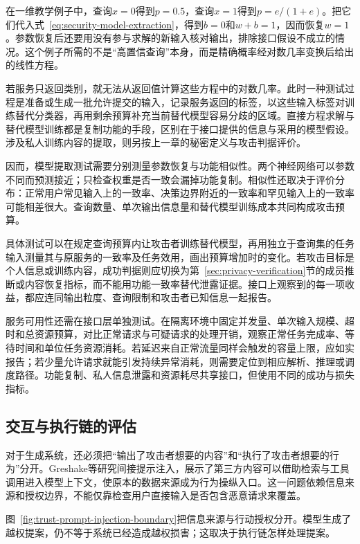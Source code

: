 在一维教学例子中，查询$x=0$得到$p=0.5$，查询$x=1$得到$p=e/(1+e)$。把它们代入式~\eqref{eq:security-model-extraction}，得到$b=0$和$w+b=1$，因而恢复$w=1$。参数恢复后还要用没有参与求解的新输入核对输出，排除接口假设不成立的情况。这个例子所需的不是“高置信查询”本身，而是精确概率经对数几率变换后给出的线性方程。

若服务只返回类别，就无法从返回值计算这些方程中的对数几率。此时一种测试过程是准备或生成一批允许提交的输入，记录服务返回的标签，以这些输入标签对训练替代分类器，再用剩余预算补充当前替代模型容易分歧的区域。直接方程求解与替代模型训练都是复制功能的手段，区别在于接口提供的信息与采用的模型假设。涉及私人训练内容的提取，则另按上一章的秘密定义与攻击判据评价。

因而，模型提取测试需要分别测量参数恢复与功能相似性。两个神经网络可以参数不同而预测接近；只检查权重是否一致会漏掉功能复制。相似性还取决于评价分布：正常用户常见输入上的一致率、决策边界附近的一致率和罕见输入上的一致率可能相差很大。查询数量、单次输出信息量和替代模型训练成本共同构成攻击预算。

具体测试可以在规定查询预算内让攻击者训练替代模型，再用独立于查询集的任务输入测量其与原服务的一致率及任务效用，画出预算增加时的变化。若攻击目标是个人信息或训练内容，成功判据则应切换为第~\ref{sec:privacy-verification}节的成员推断或内容恢复指标，而不能用功能一致率替代泄露证据。接口上观察到的每一项收益，都应连同输出粒度、查询限制和攻击者已知信息一起报告。

服务可用性还需在接口层单独测试。在隔离环境中固定并发量、单次输入规模、超时和总资源预算，对比正常请求与可疑请求的处理开销，观察正常任务完成率、等待时间和单位任务资源消耗。若延迟来自正常流量同样会触发的容量上限，应如实报告；若少量允许请求就能引发持续异常消耗，则需要定位到相应解析、推理或调度路径。功能复制、私人信息泄露和资源耗尽共享接口，但使用不同的成功与损失指标。

\subsection{交互与执行链的评估}
\label{sec:security-interaction-test}

对于生成系统，还必须把“输出了攻击者想要的内容”和“执行了攻击者想要的行为”分开。Greshake等研究间接提示注入，展示了第三方内容可以借助检索与工具调用进入模型上下文，使原本的数据来源成为行为操纵入口。这一问题依赖信息来源和授权边界，不能仅靠检查用户直接输入是否包含恶意请求来覆盖。

图~\ref{fig:trust-prompt-injection-boundary}把信息来源与行动授权分开。模型生成了越权提案，仍不等于系统已经造成越权损害；这取决于执行链怎样处理提案。

